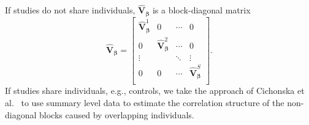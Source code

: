 \documentclass{nature}
\def\bs{\boldsymbol}
\begin{document}
If studies do not share individuals, $\widehat{\mathbf{\textrm{V}}}_{{\bs {\beta}}}$ is a block-diagonal matrix 
$$\widehat{\mathbf{\textrm{V}}}_{{\bs {\beta}}}=
 \left[\begin{array}{c|c|c|c}
 \widehat{\mathbf{\textrm{V}}}^{1}_{{\bs \beta}} & 0 & \cdots &0\\ \hline
0 & \widehat{\mathbf{\textrm{V}}}^{2}_{{\bs \beta}}&\cdots &0 \\ \hline
\vdots & &\ddots &\vdots \\ \hline
0 & 0 &\cdots & \widehat{\mathbf{\textrm{V}}}^{S}_{{\bs {\beta}}}\\
\end{array}\right].$$
If studies share individuals, e.g., controls, 
we take the approach of Cichonska et al.~\cite{cichonska2016metacca} to use summary level data
to estimate the correlation structure of the non-diagonal blocks caused by overlapping individuals. 
\end{document}
